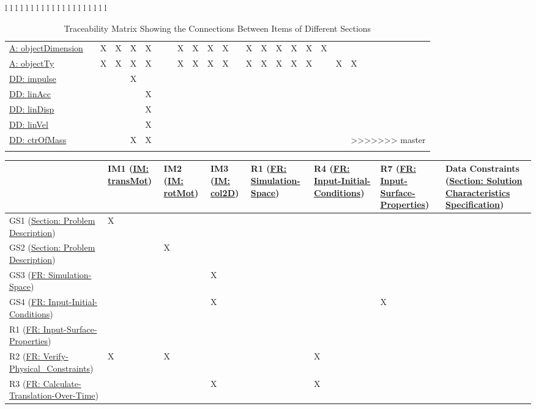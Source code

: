 \documentclass[12pt]{article}
\begin{document}
\begin{longtable}{l l l l l l l l l l l l l l l l l l l l}
\begin{longtable}{l l l l l l l l l l l l l l l l l l l l l}
\\
\hyperref[assumpOD]{A: objectDimension} &  & X & X & X & X &  &  & X & X & X & X &  & X & X & X & X & X & X &  & 
\\
\hyperref[assumpOT]{A: objectTy} &  & X & X & X & X &  &  & X & X & X & X &  & X & X & X & X & X &  & X & X
\\
\hyperref[DD:impulse]{DD: impulse} &  &  &  & X &  &  &  &  &  &  &  &  &  &  &  &  &  &  &  & 
\\
\hyperref[DD:linAcc]{DD: linAcc} &  &  &  &  & X &  &  &  &  &  &  &  &  &  &  &  &  &  &  & 
\\
\hyperref[DD:linDisp]{DD: linDisp} &  &  &  &  & X &  &  &  &  &  &  &  &  &  &  &  &  &  &  & 
\\
\hyperref[DD:linVel]{DD: linVel} &  &  &  &  & X &  &  &  &  &  &  &  &  &  &  &  &  &  &  & 
\\
\hyperref[DD:ctrOfMass]{DD: ctrOfMass} &  &  &  & X & X &  &  &  &  &  &  &  &  &  &  &  &  &  &  & 
>>>>>>> master
\\
\bottomrule
\caption{Traceability Matrix Showing the Connections Between Items of Different Sections}
\label{Table:Tracey}
\end{longtable}
\begin{longtable}{l l l l l l l l}
\toprule
 & IM1 (\hyperref[IM:transMot]{IM: transMot}) & IM2 (\hyperref[IM:rotMot]{IM: rotMot}) & IM3 (\hyperref[IM:col2D]{IM: col2D}) & R1 (\hyperref[reqSS]{FR: Simulation-Space}) & R4 (\hyperref[reqIIC]{FR: Input-Initial-Conditions}) & R7 (\hyperref[reqISP]{FR: Input-Surface-Properties}) & Data Constraints (\hyperref[Sec:SolCharSpec]{Section: Solution Characteristics Specification})
\\
\midrule
\endhead
GS1 (\hyperref[Sec:ProbDesc]{Section: Problem Description}) & X &  &  &  &  &  & 
\\
GS2 (\hyperref[Sec:ProbDesc]{Section: Problem Description}) &  & X &  &  &  &  & 
\\
GS3 (\hyperref[reqSS]{FR: Simulation-Space}) &  &  & X &  &  &  & 
\\
GS4 (\hyperref[reqIIC]{FR: Input-Initial-Conditions}) &  &  & X &  &  & X & 
\\
R1 (\hyperref[reqISP]{FR: Input-Surface-Properties}) &  &  &  &  &  &  & 
\\
R2 (\hyperref[reqVPC]{FR: Verify-Physical\_Constraints}) & X & X &  &  & X &  & 
\\
R3 (\hyperref[reqCTOT]{FR: Calculate-Translation-Over-Time}) &  &  & X &  & X &  & 
\\

\end{longtable}
\end{longtable}
\end{document}
